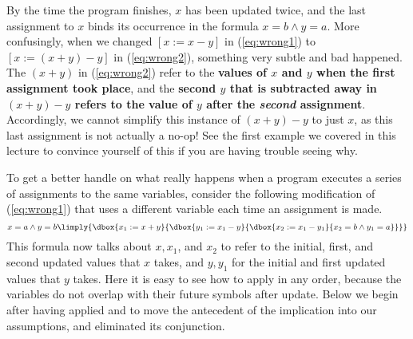 \documentclass[11pt,twoside]{scrartcl}
\begin{document}
By the time the program finishes, $x$ has been updated twice, and the last assignment to $x$ binds its occurrence in the formula $x = b \land y = a$.
More confusingly, when we changed $[x := x - y]$ in (\ref{eq:wrong1}) to $[x := (x + y) - y]$ in (\ref{eq:wrong2}), something very subtle and bad happened.
The $(x+y)$ in (\ref{eq:wrong2}) refer to the \textbf{values of $x$ and $y$ when the first assignment took place}, and the \textbf{second $y$ that is subtracted away in $(x+y)-y$ refers to the value of $y$ after the \emph{second} assignment}.
Accordingly, we cannot simplify this instance of $(x + y) - y$ to just $x$, as this last assignment is not actually a no-op!
See the first example we covered in this lecture to convince yourself of this if you are having trouble seeing why.

To get a better handle on what really happens when a program executes a series of assignments to the same variables, consider the following modification of (\ref{eq:wrong1}) that uses a different variable each time an assignment is made.
\begin{equation}
\label{eq:right1}
x = a \land y = b \limply {\dbox{x_1 := x + y}{\dbox{y_1 := x_1 - y}{\dbox{x_2 := x_1 - y_1}{x_2 = b \land y_1 = a}}}}
\end{equation}
This formula now talks about $x, x_1$, and $x_2$ to refer to the initial, first, and second updated values that $x$ takes, and $y, y_1$ for the initial and first updated values that $y$ takes.
Here it is easy to see how to apply  in any order, because the variables do not overlap with their future symbols after update.
Below we begin after having applied  and  to move the antecedent of the implication into our assumptions, and eliminated its conjunction.
\begin{sequentdeduction}[array]
   {
  }
\end{sequentdeduction}
\end{document}
